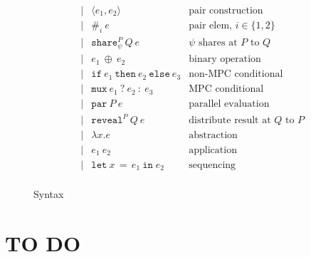 \documentclass[10pt]{article}
\newcommand{\kw}[1]{\ensuremath{\mathtt{#1}}}
\newcommand{\isec}{\ensuremath{\mathtt{pmap}}}
\newcommand{\ebinop}[2]{\ensuremath{{#1}~\oplus~{#2}}}
\newcommand{\elet}[3]{\ensuremath{\kw{let}~#1\, =\, #2~\kw{in}\;{#3}}}
\newcommand{\epar}[2]{\ensuremath{\kw{par}~{#1}~{#2}}}
\newcommand{\esec}[2]{\ensuremath{\kw{sec}~{#1}~{#2}}}
\newcommand{\ereveal}[3]{\ensuremath{\kw{reveal}^{#1}~{#2}~{#3}}}
\newcommand{\econd}[3]{\ensuremath{\kw{if}~{#1}~\kw{then}~{#2}~\kw{else}~{#3}}}
\newcommand{\emux}[3]{\ensuremath{\kw{mux}~{#1}~\kw{?}~{#2}~\kw{:}~{#3}}}
\newcommand{\eshare}[4]{\ensuremath{\kw{share}^{#2}_{#1}~{#3}~{#4}}}
\newcommand{\esharemap}[3]{\ensuremath{\kw{sharemap}_{#1}~{#2}~{#3}}}
\newcommand{\epair}[2]{\ensuremath{\langle {#1}, {#2} \rangle}}
\newcommand{\eproj}[2]{\ensuremath{\kw{\#}}_{#1}~{#2}}
\newcommand{\elam}[2]{\ensuremath{\lambda {#1}.{#2}}}
\newcommand{\eapp}[2]{\ensuremath{{#1}~{#2}}}
\begin{document}
\begin{figure}[h]
\[\begin{array}{rlcll}
                       && \mid & \epair{e_1}{e_2} & \text{pair construction}\\
                       && \mid & \eproj{i}{e} & \text{pair elem, }i \in \{1,2\}\\
                       && \mid & \eshare{\psi}{P}{Q}{e} & \text{$\psi$ shares at $P$ to $Q$} \\
                       && \mid & \ebinop{e_1}{e_2}  & \text{binary operation} \\
                       && \mid & \econd{e_1}{e_2}{e_3}  & \text{non-MPC conditional} \\
                       && \mid & \emux{e_1}{e_2}{e_3}  & \text{MPC conditional} \\
                       && \mid & \epar{P}{e} & \text{parallel evaluation}\\
                       && \mid & \ereveal{P}{Q}{e} & \text{distribute result at $Q$ to $P$}\\
                       && \mid & \elam{x}{e}  & \text{abstraction} \\
                       && \mid & \eapp{e_1}{e_2}  & \text{application} \\
                       && \mid & \elet{x}{e_1}{e_2}  & \text{sequencing} \\
  \end{array}
  \]
  \caption{Syntax}
  \label{fig:syntax}
\end{figure}

\section{TO DO}
\end{document}
